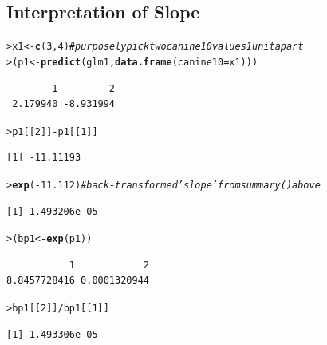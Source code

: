 \documentclass{article}\usepackage[]{graphicx}\usepackage[]{color}
\makeatletter
\newcommand{\hlnum}[1]{\textcolor[rgb]{0.686,0.059,0.569}{#1}}%
\newcommand{\hlcom}[1]{\textcolor[rgb]{0.678,0.584,0.686}{\textit{#1}}}%
\newcommand{\hlopt}[1]{\textcolor[rgb]{0,0,0}{#1}}%
\newcommand{\hlstd}[1]{\textcolor[rgb]{0.345,0.345,0.345}{#1}}%
\newcommand{\hlkwb}[1]{\textcolor[rgb]{0.69,0.353,0.396}{#1}}%
\newcommand{\hlkwc}[1]{\textcolor[rgb]{0.333,0.667,0.333}{#1}}%
\newcommand{\hlkwd}[1]{\textcolor[rgb]{0.737,0.353,0.396}{\textbf{#1}}}%
\newenvironment{kframe}{%
 \def\at@end@of@kframe{}%
 \ifinner\ifhmode%
  \def\at@end@of@kframe{\end{minipage}}%
  \begin{minipage}{\columnwidth}%
 \fi\fi%
 \def\FrameCommand##1{\hskip\@totalleftmargin \hskip-\fboxsep
 \colorbox{shadecolor}{##1}\hskip-\fboxsep
     \hskip-\linewidth \hskip-\@totalleftmargin \hskip\columnwidth}%
 \MakeFramed {\advance\hsize-\width
   \@totalleftmargin\z@ \linewidth\hsize
   \@setminipage}}%
 {\par\unskip\endMakeFramed%
 \at@end@of@kframe}
\newenvironment{knitrout}{}{} %
\makeatother
\begin{document}
\subsection{Interpretation of Slope}
\begin{knitrout}
\color{fgcolor}\begin{kframe}
\begin{alltt}
\hlstd{> }\hlstd{x1} \hlkwb{<-} \hlkwd{c}\hlstd{(}\hlnum{3}\hlstd{,}\hlnum{4}\hlstd{)}                  \hlcom{# purposely pick two canine10 values 1 unit apart}
\hlstd{> }\hlstd{( p1} \hlkwb{<-} \hlkwd{predict}\hlstd{(glm1,}\hlkwd{data.frame}\hlstd{(}\hlkwc{canine10}\hlstd{=x1)) )}
\end{alltt}
\begin{verbatim}
        1         2 
 2.179940 -8.931994 
\end{verbatim}
\begin{alltt}
\hlstd{> }\hlstd{p1[[}\hlnum{2}\hlstd{]]}\hlopt{-}\hlstd{p1[[}\hlnum{1}\hlstd{]]}
\end{alltt}
\begin{verbatim}
[1] -11.11193
\end{verbatim}
\begin{alltt}
\hlstd{> }\hlkwd{exp}\hlstd{(}\hlopt{-}\hlnum{11.112}\hlstd{)}                  \hlcom{# back-transformed 'slope' from summary() above}
\end{alltt}
\begin{verbatim}
[1] 1.493206e-05
\end{verbatim}
\begin{alltt}
\hlstd{> }\hlstd{( bp1} \hlkwb{<-} \hlkwd{exp}\hlstd{(p1) )}
\end{alltt}
\begin{verbatim}
           1            2 
8.8457728416 0.0001320944 
\end{verbatim}
\begin{alltt}
\hlstd{> }\hlstd{bp1[[}\hlnum{2}\hlstd{]]}\hlopt{/}\hlstd{bp1[[}\hlnum{1}\hlstd{]]}
\end{alltt}
\begin{verbatim}
[1] 1.493306e-05
\end{verbatim}
\end{kframe}
\end{knitrout}
\end{document}

